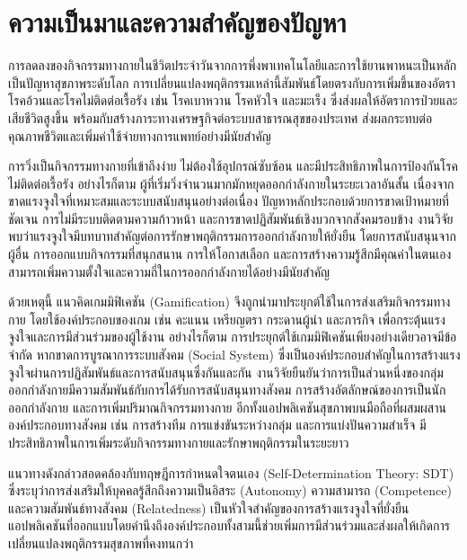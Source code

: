 \section{ความเป็นมาและความสำคัญของปัญหา}

การลดลงของกิจกรรมทางกายในชีวิตประจำวันจากการพึ่งพาเทคโนโลยีและการใช้ยานพาหนะเป็นหลัก เป็นปัญหาสุขภาพระดับโลก การเปลี่ยนแปลงพฤติกรรมเหล่านี้สัมพันธ์โดยตรงกับการเพิ่มขึ้นของอัตราโรคอ้วนและโรคไม่ติดต่อเรื้อรัง เช่น โรคเบาหวาน โรคหัวใจ และมะเร็ง ซึ่งส่งผลให้อัตราการป่วยและเสียชีวิตสูงขึ้น พร้อมกับสร้างภาระทางเศรษฐกิจต่อระบบสาธารณสุขของประเทศ ส่งผลกระทบต่อคุณภาพชีวิตและเพิ่มค่าใช้จ่ายทางการแพทย์อย่างมีนัยสำคัญ \cite{dhuli2022}

การวิ่งเป็นกิจกรรมทางกายที่เข้าถึงง่าย ไม่ต้องใช้อุปกรณ์ซับซ้อน และมีประสิทธิภาพในการป้องกันโรคไม่ติดต่อเรื้อรัง อย่างไรก็ตาม ผู้ที่เริ่มวิ่งจำนวนมากมักหยุดออกกำลังกายในระยะเวลาอันสั้น เนื่องจากขาดแรงจูงใจที่เหมาะสมและระบบสนับสนุนอย่างต่อเนื่อง ปัญหาหลักประกอบด้วยการขาดเป้าหมายที่ชัดเจน การไม่มีระบบติดตามความก้าวหน้า และการขาดปฏิสัมพันธ์เชิงบวกจากสังคมรอบข้าง งานวิจัยพบว่าแรงจูงใจมีบทบาทสำคัญต่อการรักษาพฤติกรรมการออกกำลังกายให้ยั่งยืน โดยการสนับสนุนจากผู้อื่น การออกแบบกิจกรรมที่สนุกสนาน การให้โอกาสเลือก และการสร้างความรู้สึกมีคุณค่าในตนเอง สามารถเพิ่มความตั้งใจและความถี่ในการออกกำลังกายได้อย่างมีนัยสำคัญ \cite{cachon2023}

ด้วยเหตุนี้ แนวคิดเกมมิฟิเคชัน (Gamification) จึงถูกนำมาประยุกต์ใช้ในการส่งเสริมกิจกรรมทางกาย โดยใช้องค์ประกอบของเกม เช่น คะแนน เหรียญตรา กระดานผู้นำ และภารกิจ เพื่อกระตุ้นแรงจูงใจและการมีส่วนร่วมของผู้ใช้งาน \cite{fu2024} อย่างไรก็ตาม การประยุกต์ใช้เกมมิฟิเคชันเพียงอย่างเดียวอาจมีข้อจำกัด หากขาดการบูรณาการระบบสังคม (Social System) ซึ่งเป็นองค์ประกอบสำคัญในการสร้างแรงจูงใจผ่านการปฏิสัมพันธ์และการสนับสนุนซึ่งกันและกัน งานวิจัยยืนยันว่าการเป็นส่วนหนึ่งของกลุ่มออกกำลังกายมีความสัมพันธ์กับการได้รับการสนับสนุนทางสังคม การสร้างอัตลักษณ์ของการเป็นนักออกกำลังกาย และการเพิ่มปริมาณกิจกรรมทางกาย \cite{golaszewski2022} อีกทั้งแอปพลิเคชันสุขภาพบนมือถือที่ผสมผสานองค์ประกอบทางสังคม เช่น การสร้างทีม การแข่งขันระหว่างกลุ่ม และการแบ่งปันความสำเร็จ มีประสิทธิภาพในการเพิ่มระดับกิจกรรมทางกายและรักษาพฤติกรรมในระยะยาว \cite{tong2018}

แนวทางดังกล่าวสอดคล้องกับทฤษฎีการกำหนดใจตนเอง (Self-Determination Theory: SDT) ซึ่งระบุว่าการส่งเสริมให้บุคคลรู้สึกถึงความเป็นอิสระ (Autonomy) ความสามารถ (Competence) และความสัมพันธ์ทางสังคม (Relatedness) เป็นหัวใจสำคัญของการสร้างแรงจูงใจที่ยั่งยืน แอปพลิเคชันที่ออกแบบโดยคำนึงถึงองค์ประกอบทั้งสามนี้ช่วยเพิ่มการมีส่วนร่วมและส่งผลให้เกิดการเปลี่ยนแปลงพฤติกรรมสุขภาพที่คงทนกว่า \cite{ryan2020}

